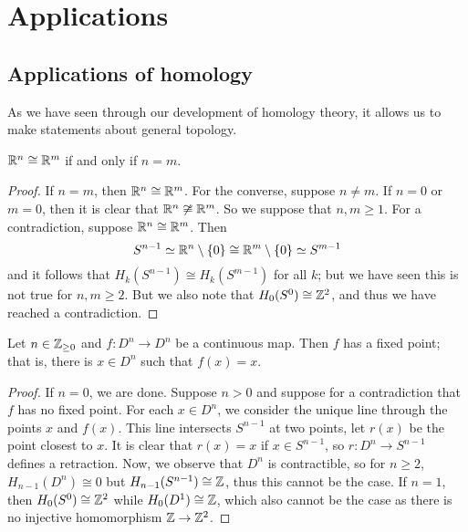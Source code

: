 \section{Applications}

\subsection{Applications of homology}

As we have seen through our development of homology theory, it allows us to make statements about general topology.

\begin{theorem}
  $\mathbb{R}^n \cong \mathbb{R}^m$ if and only if $n = m$.
\end{theorem}

\begin{proof}
  If $n = m$, then $\mathbb{R}^n \cong \mathbb{R}^m$. For the converse, suppose $n \neq m$. If $n = 0$ or $m = 0$, then it is clear that $\mathbb{R}^n \not\cong \mathbb{R}^m$. So we suppose that $n, m \geq 1$. For a contradiction, suppose $\mathbb{R}^n \cong \mathbb{R}^m$. Then
  \[ S^{n-1} \simeq \mathbb{R}^n \setminus \{0\} \cong \mathbb{R}^m \setminus \{0\} \simeq S^{m-1} \]
  and it follows that $H_k(S^{n-1}) \cong H_k(S^{m-1})$ for all $k$; but we have seen this is not true for $n, m \geq 2$. But we also note that $H_0(S^0) \cong \mathbb{Z}^2$, and thus we have reached a contradiction.
\end{proof}

\begin{theorem}
  Let $n \in \mathbb{Z}_{\geq 0}$ and $f: D^n \to D^n$ be a continuous map. Then $f$ has a fixed point; that is, there is $x \in D^n$ such that $f(x) = x$.
\end{theorem}

\begin{proof}
  If $n = 0$, we are done. Suppose $n > 0$ and suppose for a contradiction that $f$ has no fixed point. For each $x \in D^n$, we consider the unique line through the points $x$ and $f(x)$. This line intersects $S^{n-1}$ at two points, let $r(x)$ be the point closest to $x$. It is clear that $r(x) = x$ if $x \in S^{n-1}$, so $r: D^n \to S^{n-1}$ defines a retraction. Now, we observe that $D^n$ is contractible, so for $n \geq 2$, $H_{n-1}(D^n) \cong 0$ but $H_{n-1}(S^{n-1}) \cong \mathbb{Z}$, thus this cannot be the case. If $n = 1$, then $H_0(S^0) \cong \mathbb{Z}^2$ while $H_0(D^1) \cong \mathbb{Z}$, which also cannot be the case as there is no injective homomorphism $\mathbb{Z} \to \mathbb{Z}^2$.
\end{proof}

